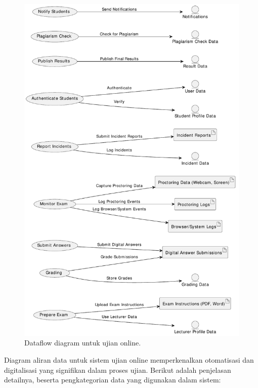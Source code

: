 \begin{figure}[th!]
	\centering
	\includegraphics[width=0.7\linewidth]{../figures/dataflow_online_exam}
	\caption{Dataflow diagram untuk ujian online.}
	\label{fig:dataflow_online_exam}
\end{figure}

Diagram aliran data untuk sistem ujian online memperkenalkan otomatisasi dan digitalisasi yang signifikan dalam proses ujian. Berikut adalah penjelasan detailnya, beserta pengkategorian data yang digunakan dalam sistem:

